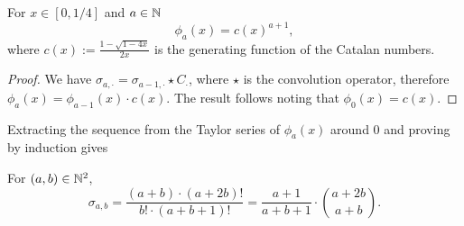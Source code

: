  \begin{myprop}
    For $x\in [0,1/4]$ and $a\in \mathbb{N}$ 
    $$\phi_a(x)=c(x)^{a+1},$$
    where $c(x):=\frac{1-\sqrt{1-4x}}{2x}$ is the generating function of the Catalan numbers.
 \end{myprop}
 \begin{proof}
    We have $\sigma_{a,\cdot}=\sigma_{a-1,\cdot}\star C_\cdot$, where $\star$ is the convolution operator, therefore $\phi_a(x)=\phi_{a-1}(x)\cdot c(x)$. The result follows noting that $\phi_0(x)=c(x)$.
 \end{proof}
 
Extracting the sequence from the Taylor series of $\phi_a(x)$ around 0 and proving by induction gives
 \begin{myprop}
    \label{enum-sigma}
    For $(a,b)\in\mathbb{N}^2$,
    $$\sigma_{a,b}=\frac{(a+b)\cdot(a+2b)!}{b!\cdot(a+b+1)!}=\frac{a+1}{a+b+1}\cdot {a+2b\choose a+b}.$$
 \end{myprop}


